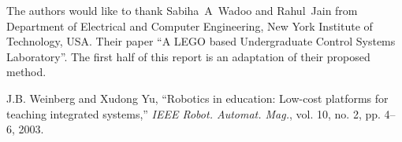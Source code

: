\documentclass[a4paper,10pt]{article}
\begin{document}
The authors would like to thank Sabiha~A~Wadoo and Rahul~Jain from Department of Electrical and Computer Engineering, New York Institute of Technology, USA. Their paper ``A LEGO based Undergraduate Control Systems Laboratory''. The first half of this report is an adaptation of their proposed method.


\ifCLASSOPTIONcaptionsoff
  \newpage
\fi





%
%
%
\begin{thebibliography}{1}

J.B. Weinberg and Xudong Yu, ``Robotics in education: Low-cost platforms for teaching integrated systems,'' \emph{IEEE Robot. Automat. Mag.}, vol. 10, no. 2, pp. 4–6, 2003.

\end{thebibliography}

% 
\end{document}
